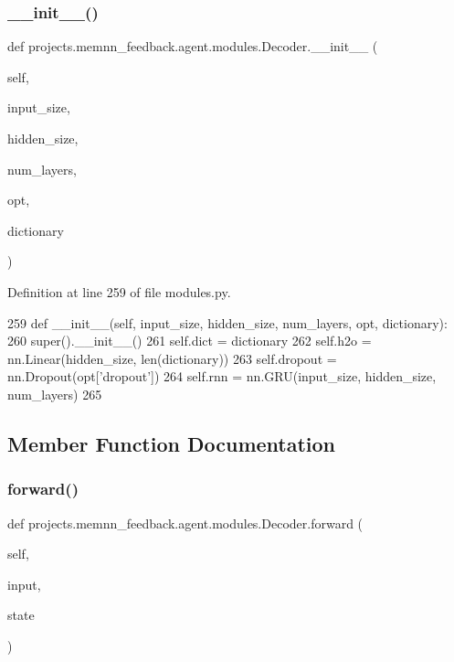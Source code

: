 \subsubsection{\texorpdfstring{\+\_\+\+\_\+init\+\_\+\+\_\+()}{\_\_init\_\_()}}
{\footnotesize\ttfamily def projects.\+memnn\+\_\+feedback.\+agent.\+modules.\+Decoder.\+\_\+\+\_\+init\+\_\+\+\_\+ (\begin{DoxyParamCaption}\item[{}]{self,  }\item[{}]{input\+\_\+size,  }\item[{}]{hidden\+\_\+size,  }\item[{}]{num\+\_\+layers,  }\item[{}]{opt,  }\item[{}]{dictionary }\end{DoxyParamCaption})}



Definition at line 259 of file modules.\+py.


\begin{DoxyCode}
259     \textcolor{keyword}{def }\_\_init\_\_(self, input\_size, hidden\_size, num\_layers, opt, dictionary):
260         super().\_\_init\_\_()
261         self.dict = dictionary
262         self.h2o = nn.Linear(hidden\_size, len(dictionary))
263         self.dropout = nn.Dropout(opt[\textcolor{stringliteral}{'dropout'}])
264         self.rnn = nn.GRU(input\_size, hidden\_size, num\_layers)
265 
\end{DoxyCode}


\subsection{Member Function Documentation}
\mbox{\label{classprojects_1_1memnn__feedback_1_1agent_1_1modules_1_1Decoder_afea4d72e2b956ae9c2f896a6f2bf2ff2}} 
\subsubsection{\texorpdfstring{forward()}{forward()}}
{\footnotesize\ttfamily def projects.\+memnn\+\_\+feedback.\+agent.\+modules.\+Decoder.\+forward (\begin{DoxyParamCaption}\item[{}]{self,  }\item[{}]{input,  }\item[{}]{state }\end{DoxyParamCaption})}



